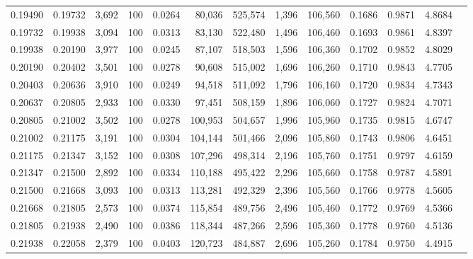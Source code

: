 \begin{tabular}{rrrrrrrrrrrrr}
0.19490 & 0.19732 &  3,692 & 100 &                                     0.0264 &  80,036 & 525,574 &   1,396 & 106,560 & 0.1686 & 0.9871 & 4.8684 \\
0.19732 & 0.19938 &  3,094 & 100 &                                     0.0313 &  83,130 & 522,480 &   1,496 & 106,460 & 0.1693 & 0.9861 & 4.8397 \\
0.19938 & 0.20190 &  3,977 & 100 &                                     0.0245 &  87,107 & 518,503 &   1,596 & 106,360 & 0.1702 & 0.9852 & 4.8029 \\
0.20190 & 0.20402 &  3,501 & 100 &                                     0.0278 &  90,608 & 515,002 &   1,696 & 106,260 & 0.1710 & 0.9843 & 4.7705 \\
0.20403 & 0.20636 &  3,910 & 100 &                                     0.0249 &  94,518 & 511,092 &   1,796 & 106,160 & 0.1720 & 0.9834 & 4.7343 \\
0.20637 & 0.20805 &  2,933 & 100 &                                     0.0330 &  97,451 & 508,159 &   1,896 & 106,060 & 0.1727 & 0.9824 & 4.7071 \\
0.20805 & 0.21002 &  3,502 & 100 &                                     0.0278 & 100,953 & 504,657 &   1,996 & 105,960 & 0.1735 & 0.9815 & 4.6747 \\
0.21002 & 0.21175 &  3,191 & 100 &                                     0.0304 & 104,144 & 501,466 &   2,096 & 105,860 & 0.1743 & 0.9806 & 4.6451 \\
0.21175 & 0.21347 &  3,152 & 100 &                                     0.0308 & 107,296 & 498,314 &   2,196 & 105,760 & 0.1751 & 0.9797 & 4.6159 \\
0.21347 & 0.21500 &  2,892 & 100 &                                     0.0334 & 110,188 & 495,422 &   2,296 & 105,660 & 0.1758 & 0.9787 & 4.5891 \\
0.21500 & 0.21668 &  3,093 & 100 &                                     0.0313 & 113,281 & 492,329 &   2,396 & 105,560 & 0.1766 & 0.9778 & 4.5605 \\
0.21668 & 0.21805 &  2,573 & 100 &                                     0.0374 & 115,854 & 489,756 &   2,496 & 105,460 & 0.1772 & 0.9769 & 4.5366 \\
0.21805 & 0.21938 &  2,490 & 100 &                                     0.0386 & 118,344 & 487,266 &   2,596 & 105,360 & 0.1778 & 0.9760 & 4.5136 \\
0.21938 & 0.22058 &  2,379 & 100 &                                     0.0403 & 120,723 & 484,887 &   2,696 & 105,260 & 0.1784 & 0.9750 & 4.4915 \\

\end{tabular}
